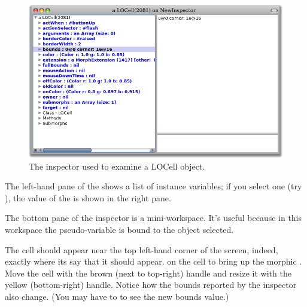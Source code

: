 \documentclass[a4paper,10pt,twoside]{book}
\begin{document}
\begin{figure}[htbp]
   \centering
   \includegraphics[width=\textwidth]{LOCellInspector} 
   \caption{The inspector used to examine a LOCell object.}
\end{figure}

The left-hand pane of the  shows a list of instance variables; if you select one (try \mbox{),} the value of the  is shown in the right pane.


The bottom pane of the inspector is a mini-workspace.  It's useful because in this workspace the pseudo-variable \self is bound to the object selected. 

The cell should appear near the top left-hand corner of the screen, indeed, exactly where its  say that it should appear.
\metaclick on the cell to bring up the morphic .
Move the cell with the brown (next to top-right) handle and resize it with the yellow (bottom-right) handle.
Notice how the bounds reported by the inspector also change.
(You may have to \actclick{}  to see the new bounds value.)
\end{document}
